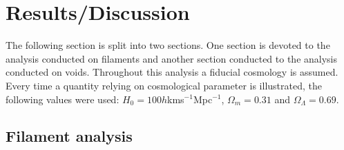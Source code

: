 \chapter{Results/Discussion}\label{sec:results}
The following section is split into two sections. One section is devoted to the analysis conducted on filaments and another section conducted to the analysis conducted on voids. Throughout this analysis a fiducial cosmology is assumed. Every time a quantity relying on cosmological parameter is illustrated, the following values were used: $H_0=100h$kms$^{-1}$Mpc$^{-1}$, $\Omega_m=0.31$ and $\Omega_\Lambda=0.69$. 
\section{Filament analysis}\label{sec:filaments}


